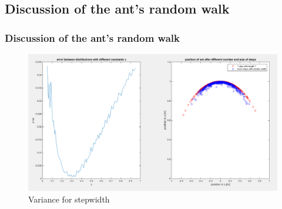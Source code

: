 \documentclass[ignorenonframetext]{beamer}
\begin{document}
\subsection{Discussion of the ant's random walk}
\begin{frame}
\frametitle{Discussion of the ant's random walk}
\begin{figure}[H]
\centering
\includegraphics[scale=0.2]{./Pics/VarianceForStepWidth_plot.png} 
\caption{Variance for stepwidth}
\end{figure} 
\end{frame}
\end{document}
